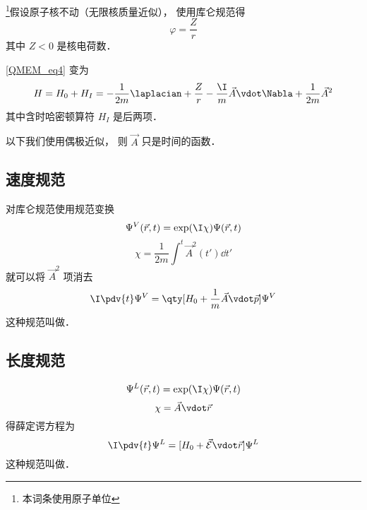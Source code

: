 
\footnote{本词条使用原子单位}假设原子核不动（无限核质量近似）， 使用库仑规范得
\begin{equation}
\varphi = \frac{Z}{r}
\end{equation}
其中 $Z < 0$ 是核电荷数．

\autoref{QMEM_eq4} 变为
\begin{equation}
H = H_0 + H_I = -\frac{1}{2m} \laplacian +  \frac{Z}{r} - \frac{\I}{m} \vec A \vdot \Nabla + \frac{1}{2m} \vec A^2
\end{equation}
其中含时哈密顿算符 $H_I$ 是后两项．

以下我们使用偶极近似， 则 $\vec A$ 只是时间的函数．

\subsection{速度规范}
 对库仑规范使用规范变换
\begin{equation}\label{EMHydr_eq3}
\Psi^V(\vec r, t) =  \exp(\I \chi) \Psi(\vec r, t)
\end{equation}
\begin{equation}\label{EMHydr_eq4}
\chi = \frac{1}{2m} \int^t \vec A^2(t') \dd{t'}
\end{equation}
就可以将 $\vec A^2$ 项消去
\begin{equation}
\I \pdv{t} \Psi^V = \qty[H_0 + \frac{1}{m} \vec A \vdot \vec p] \Psi^V
\end{equation}
这种规范叫做．

\subsection{长度规范}

\begin{equation}
\Psi^L(\vec r, t) =  \exp(\I \chi) \Psi(\vec r, t)
\end{equation}
\begin{equation}
\chi = \vec A \vdot \vec r
\end{equation}
得薛定谔方程为
\begin{equation}
\I \pdv{t} \Psi^L = [H_0 + \vec{\mathcal{E}} \vdot \vec r] \Psi^L
\end{equation}
这种规范叫做．
